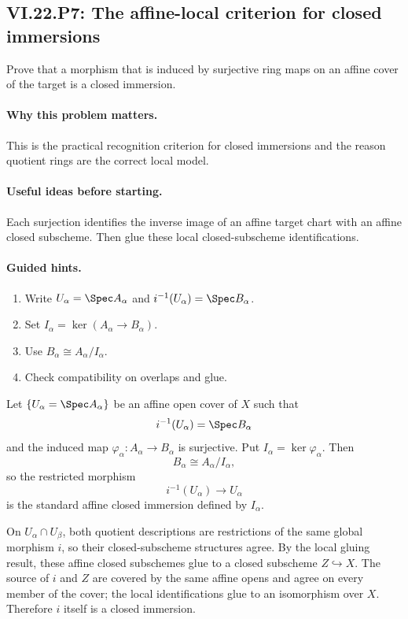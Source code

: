 \subsection*{VI.22.P7: The affine-local criterion for closed immersions}
\begin{problem}\label{prob:vi22-p07}
Prove that a morphism that is induced by surjective ring maps on an affine cover of the target is a closed immersion.
\end{problem}

\ifdefined\FullProblemDossiers
\paragraph{Why this problem matters.}
This is the practical recognition criterion for closed immersions and the reason quotient rings are the correct local model.

\paragraph{Useful ideas before starting.}
Each surjection identifies the inverse image of an affine target chart with an affine closed subscheme.  Then glue these local closed-subscheme identifications.

\paragraph{Guided hints.}
\begin{enumerate}
\item Write $U_\alpha=\Spec A_\alpha$ and $i^{-1}(U_\alpha)=\Spec B_\alpha$.
\item Set $I_\alpha=\ker(A_\alpha\to B_\alpha)$.
\item Use $B_\alpha\cong A_\alpha/I_\alpha$.
\item Check compatibility on overlaps and glue.
\end{enumerate}

\begin{solution}
Let $\{U_\alpha=\Spec A_\alpha\}$ be an affine open cover of $X$ such
that
\[
 i^{-1}(U_\alpha)=\Spec B_\alpha
\]
and the induced map $\varphi_\alpha:A_\alpha\to B_\alpha$ is surjective.  Put
$I_\alpha=\ker\varphi_\alpha$.  Then
\[
 B_\alpha\cong A_\alpha/I_\alpha,
\]
so the restricted morphism
\[
 i^{-1}(U_\alpha)\longrightarrow U_\alpha
\]
is the standard affine closed immersion defined by $I_\alpha$.

On $U_\alpha\cap U_\beta$, both quotient descriptions are restrictions of the same global
morphism $i$, so their closed-subscheme structures agree.  By the local gluing result, these
affine closed subschemes glue to a closed subscheme $Z\hookrightarrow X$.  The source of $i$
and $Z$ are covered by the same affine opens and agree on every member of the cover; the local
identifications glue to an isomorphism over $X$.  Therefore $i$ itself is a closed immersion.
\end{solution}

